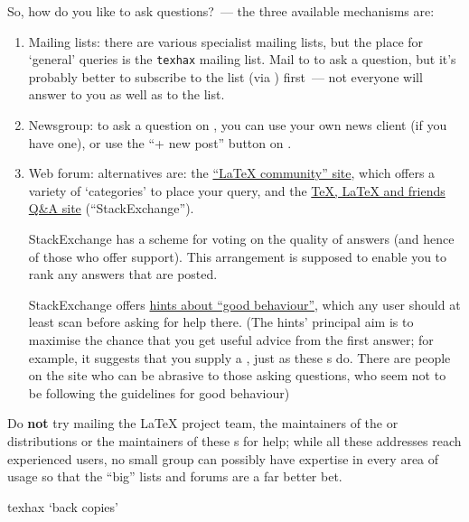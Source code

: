 So, how do you like to ask questions?~--- the three available
mechanisms are:
\begin{enumerate}
\item Mailing lists: there are various specialist mailing lists, but
  the place for `general' \alltex{} queries is the \texttt{texhax}
  mailing list.  Mail to  to ask a question,
  but it's probably better to subscribe to the list
  (via ) %
  first~--- not everyone will answer to you as well as to the list.
\item Newsgroup: to ask a question on , you
  can use your own news client (if you have one), or use the ``+ new
  post'' button on
  .
\item Web forum: alternatives are: the %
  \href{http://www.latex-community.org/}{``\LaTeX{} community'' site},
  which offers a variety of `categories' to place your query, and the
  \href{http://tex.stackexchange.com/}{\TeX{}, \LaTeX{} and friends Q\&A site}
  (``StackExchange'').

  StackExchange has a scheme for voting on the quality of answers (and
  hence of those who offer support).  This arrangement is supposed to
  enable you to rank any answers that are posted.

  StackExchange offers
  \href{http://meta.tex.stackexchange.com/questions/1436/welcome-to-tex-sx}{hints about ``good behaviour''},
  which any user should at least scan before asking for help there.
  (The hints' principal aim is to maximise the chance that you get useful
  advice from the first answer; for example, it suggests that you supply a
  , just as
  these s do.  There are people on the site who can be abrasive
  to those asking questions, who seem not to be following the
  guidelines for good behaviour)
\end{enumerate}
Do \textbf{not} try mailing the \LaTeX{} project team, the maintainers
of the \texlive{} or \miktex{} distributions or the maintainers of
these s for help; while all these addresses reach
experienced \AllTeX{} users, no small group can possibly have
expertise in every area of usage so that the ``big'' lists and forums
are a far better bet.
\begin{ctanrefs}
\item[texhax \nothtml{\rmfamily}`back copies']
\end{ctanrefs}


